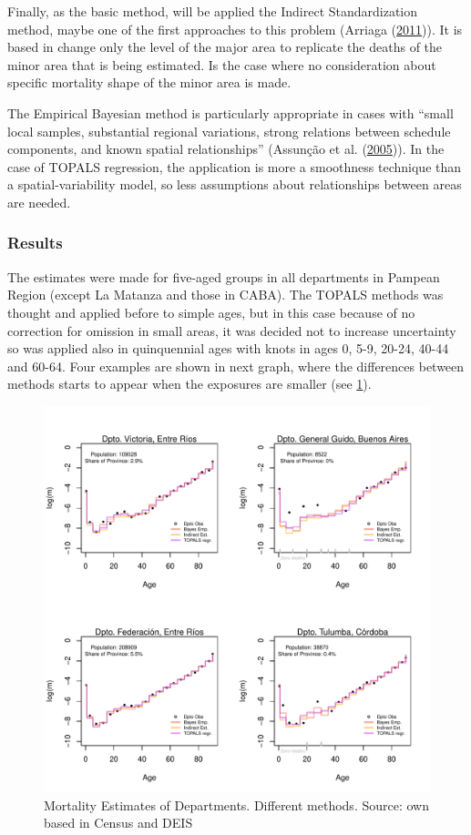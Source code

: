 \documentclass[12pt,]{article}
\begin{document}
Finally, as the basic method, will be applied the Indirect
Standardization method, maybe one of the first approaches to this
problem (Arriaga (\protect\hyperlink{ref-Arriaga2011}{2011})). It is
based in change only the level of the major area to replicate the deaths
of the minor area that is being estimated. Is the case where no
consideration about specific mortality shape of the minor area is made.

The Empirical Bayesian method is particularly appropriate in cases with
``small local samples, substantial regional variations, strong relations
between schedule components, and known spatial relationships'' (Assunção
et al. (\protect\hyperlink{ref-Assuncao2005}{2005})). In the case of
TOPALS regression, the application is more a smoothness technique than a
spatial-variability model, so less assumptions about relationships
between areas are needed.

\hypertarget{results-1}{%
\subsubsection{\texorpdfstring{\textbf{Results}}{Results}}\label{results-1}}

The estimates were made for five-aged groups in all departments in
Pampean Region (except La Matanza and those in CABA). The TOPALS methods
was thought and applied before to simple ages, but in this case because
of no correction for omission in small areas, it was decided not to
increase uncertainty so was applied also in quinquennial ages with knots
in ages 0, 5-9, 20-24, 40-44 and 60-64. Four examples are shown in next
graph, where the differences between methods starts to appear when the
exposures are smaller (see \ref{fig:Ajuste}).

\begin{figure}

{\centering \includegraphics[width=0.7\linewidth]{analysis/plots/Ajuste} 

}

\caption{Mortality Estimates of Departments. Different methods. Source: own based in Census and DEIS}\label{fig:Ajuste}
\end{figure}
\end{document}
